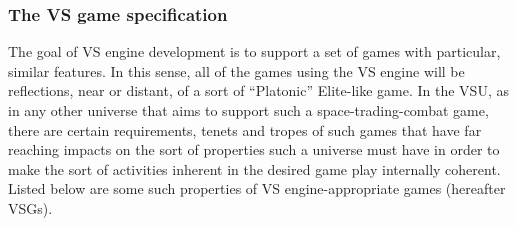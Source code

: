 

\subsubsection{The VS game specification}
\label{Danny's stuff goes here}

The goal of VS engine development is to support a set of games with
particular, similar features. In this sense, all of the games using
the VS engine will be reflections, near or distant, of a sort of
``Platonic'' Elite-like game. In the VSU, as in any other universe
that aims to support such a space-trading-combat game, there are
certain requirements, tenets and tropes of such games that have far
reaching impacts on the sort of properties such a universe must have
in order to make the sort of activities inherent in the desired
game play internally coherent. Listed below are some such properties of
VS engine-appropriate games (hereafter VSGs).

